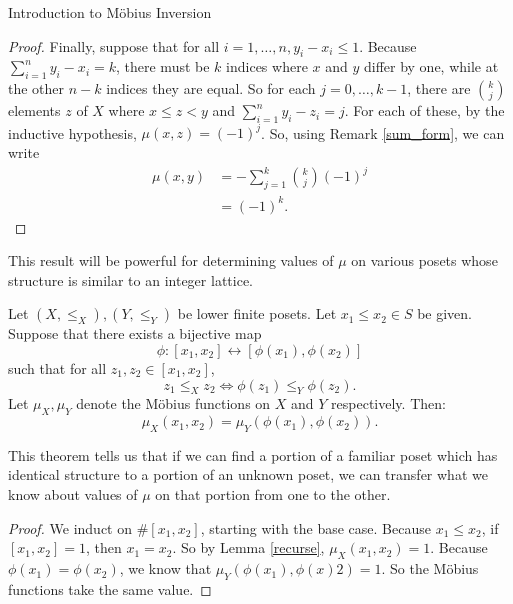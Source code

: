 \documentclass[12pt]{pom_thesis}
\begin{document}
\begin{chapter}{Introduction to M\"obius Inversion}
\begin{proof}
Finally, suppose that for all $i = 1,\dots,n, y_i-x_i \leq 1$. Because $\sum_{i=1}^ny_i-x_i =k$, there must be $k$ indices where $x$ and $y$ differ by one, while at the other $n-k$ indices they are equal. So for each $j = 0,\dots,k-1$, there are $k \choose j$ elements $z$ of $X$ where $x \leq z < y$ and $\sum_{i = 1}^n y_i-z_i = j$. For each of these, by the inductive hypothesis, $\mu(x,z) = (-1)^j$. So, using Remark \ref{sum_form}, we can write
\begin{align*}
\mu(x,y)& = -\sum_{j = 1}^k {k \choose j} (-1)^j\\
&= (-1)^k.
\end{align*}
\end{proof}
This result will be powerful for determining values of $\mu$ on various posets whose structure is similar to an integer lattice. 
\begin{thm}\label{mapping}
Let $(X, \leq_X),(Y, \leq_Y)$ be lower finite posets. Let $x_1 \leq x_2 \in S$ be given. Suppose that there exists a bijective map
\[
\phi: [x_1, x_2] \leftrightarrow [\phi(x_1), \phi(x_2)]
\]
such that for all $z_1, z_2 \in [x_1, x_2]$,
\[ 
z_1 \leq_X z_2 \iff \phi(z_1) \leq_Y \phi(z_2).
\] 
Let $\mu_X, \mu_Y$ denote the M\"obius functions on $X$ and $Y$ respectively. Then:
\[
\mu_X(x_1, x_2) = \mu_Y(\phi(x_1), \phi(x_2)).
\]
\end{thm}
This theorem tells us that if we can find a portion of a familiar poset which has identical structure to a portion of an unknown poset, we can transfer what we know about values of $\mu$ on that portion from one to the other.
\begin{proof}
We induct on $\#[x_1, x_2]$, starting with the base case. Because $x_1 \leq x_2$, if $[x_1, x_2] = 1$, then $x_1 = x_2$. So by Lemma \ref{recurse}, $\mu_X(x_1, x_2) = 1$. Because $\phi(x_1) = \phi(x_2)$, we know that $\mu_Y(\phi(x_1), \phi(x)2) = 1$. So the M\"obius functions take the same value.


\end{proof}
\end{chapter}
\end{document}
